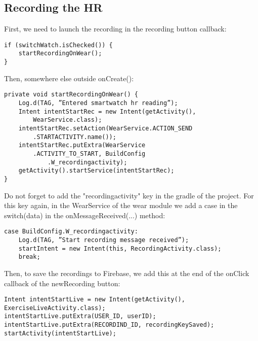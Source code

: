 \documentclass[11pt]{article}
\begin{document}
\subsection{Recording the HR}
First, we need to launch the recording in the recording button callback:
\begin{lstlisting}
if (switchWatch.isChecked()) {
    startRecordingOnWear();
}
\end{lstlisting}
Then, somewhere else outside onCreate():
\begin{lstlisting}
private void startRecordingOnWear() {
    Log.d(TAG, ”Entered smartwatch hr reading”);
    Intent intentStartRec = new Intent(getActivity(),
        WearService.class);
    intentStartRec.setAction(WearService.ACTION_SEND
        .STARTACTIVITY.name());
    intentStartRec.putExtra(WearService
        .ACTIVITY_TO_START, BuildConfig
            .W_recordingactivity);
    getActivity().startService(intentStartRec);
}
\end{lstlisting}
Do not forget to add the "recordingactivity" key in the gradle of the project.
For this key again, in the WearService of the wear module we add a case in the switch(data) in the
onMessageReceived(...) method:
\begin{lstlisting}
case BuildConfig.W_recordingactivity:
    Log.d(TAG, ”Start recording message received”);
    startIntent = new Intent(this, RecordingActivity.class);
    break;
\end{lstlisting}
Then, to save the recordings to Firebase, we add this at the end of the onClick callback of the newRecording button:
\begin{lstlisting}
Intent intentStartLive = new Intent(getActivity(), ExerciseLiveActivity.class);
intentStartLive.putExtra(USER_ID, userID);
intentStartLive.putExtra(RECORDIND_ID, recordingKeySaved);
startActivity(intentStartLive);
\end{lstlisting}
\end{document}
